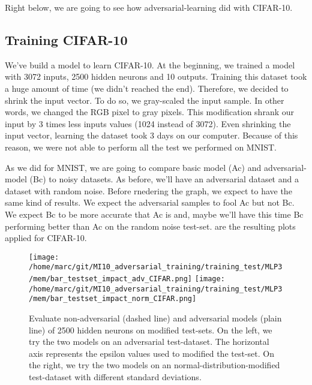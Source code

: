 		Right below, we are going to see how adversarial-learning did with CIFAR-10.


		\subsection{Training CIFAR-10} %
		\label{ssub:training_cifar_10}
			We've build a model to learn CIFAR-10. At the beginning, we trained a model with 3072 inputs, 2500 hidden neurons and 10 outputs. Training this dataset took a huge amount of time (we didn't reached the end). Therefore, we decided to shrink the input vector. To do so, we gray-scaled the input sample. In other words, we changed the RGB pixel to gray pixels. This modification shrank our input by 3 times less inputs values (1024 instead of 3072). Even shrinking the input vector, learning the dataset took 3 days on our computer. Because of this reason, we were not able to perform all the test we performed on MNIST.

			As we did for MNIST, we are going to compare basic model (Ac) and adversarial-model (Bc) to noisy datasets. As before, we'll have an adversarial dataset and a dataset with random noise. Before rnedering the graph, we expect to have the same kind of results. We expect the adversarial samples to fool Ac but not Bc. We expect Bc to be more accurate that Ac is and, maybe we'll have this time Bc performing better than Ac on the random noise test-set.  are the resulting plots applied for CIFAR-10.

			\begin{figure}
				\centering
				\texttt{[image: /home/marc/git/MI10\_adversarial\_training/training\_test/MLP3/mem/bar\_testset\_impact\_adv\_CIFAR.png]}
				\texttt{[image: /home/marc/git/MI10\_adversarial\_training/training\_test/MLP3/mem/bar\_testset\_impact\_norm\_CIFAR.png]}
				\caption{Evaluate non-adversarial (dashed line) and adversarial models (plain line) of 2500 hidden neurons on modified test-sets. On the left, we try the two models on an adversarial test-dataset. The horizontal axis represents the epsilon values used to modified the test-set. On the right, we try the two models on an normal-distribution-modified test-dataset with different standard deviations.}
				\label{fig:cifar_noisy_test}
			\end{figure}


